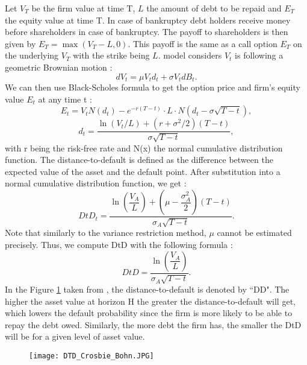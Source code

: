 Let $V_T$ be the firm value at time T, $L$ the amount of debt to be repaid and $E_T$ the equity value at time T. In case of bankruptcy debt holders receive money before shareholders in case of bankruptcy. The payoff to shareholders is then given by $E_T = \max(V_T - L,0)$. This payoff is the same as a call option $E_T$ on the underlying $V_T$ with the strike being $L$. \citet{Merton1974} model considers $V_t$ is following a geometric Brownian motion :
\begin{equation*}
dV_t = \mu V_t d_t + \sigma V_t dB_t.
\end{equation*}
We can then use Black-Scholes formula to get the option price and firm's equity value $E_t$ at any time t :
\begin{equation} \label{blackscholes}
E_t = V_t N(d_t) - e^{-r(T-t)}\cdot L \cdot N(d_t - \sigma \sqrt{T-t}),
\end{equation}
\begin{equation*}
d_t = \dfrac{\ln(V_t/L)+(r+\sigma^2/2)(T-t)}{\sigma \sqrt{T-t}},
\end{equation*}
with r being the risk-free rate and N(x) the normal cumulative distribution function.
The distance-to-default is defined as the difference between the expected value of the asset and the default point. After substitution into a normal cumulative distribution function, we get :
\begin{equation}
DtD_t = \dfrac{\ln(\dfrac{V_A}{L})+(\mu-\dfrac{\sigma_A^2}{2})(T-t)}{\sigma_A \sqrt{T-t}}.
\end{equation}
Note that similarly to the variance restriction method, $\mu$ cannot be estimated precisely. Thus, we compute DtD with the following formula :
\begin{equation}
DtD = \dfrac{\ln(\dfrac{V_A}{L})}{\sigma_A \sqrt{T-t}}.
\end{equation}
In the Figure \ref{fig:DD} taken from \citet{KMV}, the distance-to-default is denoted by ``DD". The higher the asset value at horizon H the greater the distance-to-default will get, which lowers the default probability since the firm is more likely to be able to repay the debt owed. Similarly, the more debt the firm has, the smaller the DtD will be for a given level of asset value.

\begin{figure}[h!]
\centering
\texttt{[image: DTD\_Crosbie\_Bohn.JPG]} 
\label{fig:DD}
\end{figure}



